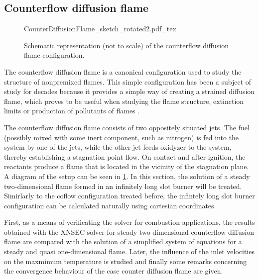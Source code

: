 
\subsection[Counterflow diffusion flame]{Counterflow diffusion flame \footnotemark}\label{ss:CDF}
\begin{figure}[h!]
	\begin{center}
		\def\svgwidth{0.8\textwidth}
		{CounterDiffusionFlame_sketch_rotated2.pdf_tex}
		\caption{Schematic representation (not to scale) of the counterflow diffusion flame configuration.}
		\label{fig:CDFScheme}
	\end{center}
\end{figure}

The counterflow diffusion flame is a canonical configuration used to study the structure of nonpremixed flames. This simple configuration has been a subject of study for decades because it provides a simple way of creating a strained diffusion flame, which proves to be useful when studying the flame structure, extinction limits or production of pollutants of flames \citep{pandyaStructureFlatCounterFlow1964,spaldingTheoryMixingChemical1961,keyesFlameSheetStarting1987, leeTwodimensionalDirectNumerical2000}. 

The counterflow diffusion flame consists of two oppositely situated jets. The fuel (possibly mixed with some inert component, such as nitrogen) is fed into the system by one of the jets, while the other jet feeds oxidyzer to the system, thereby establishing a stagnation point flow. On contact and after ignition, the reactants produce a flame that is located in the vicinity of the stagnation plane. A diagram of the setup can be seen in \cref{fig:CDFScheme}. In this section, the solution of a steady two-dimensional flame formed in an infinitely long slot burner will be treated. Simirlarly to the coflow configuration treated before, the infintely long slot burner configuration can be calculated naturally using cartesian coordinates.

First, as a means of verificating the solver for combustion applications, the results obtained with the XNSEC-solver for steady two-dimensional counterflow diffusion flame are compared with the solution of a simplified system of equations for a steady and quasi one-dimensional flame. Later, the influence of the inlet velocities on the maxmimum temperature is studied and finally some remarks concerning the convergence behaviour of the case counter diffusion flame are given. 
